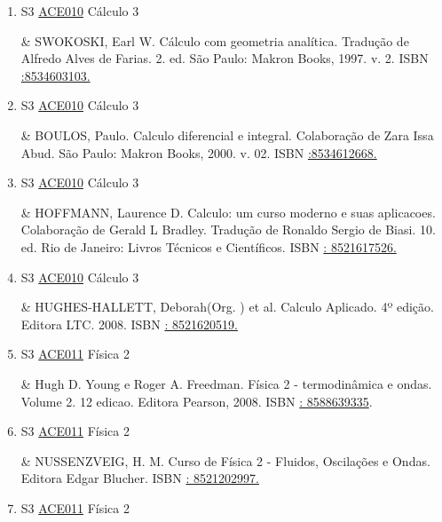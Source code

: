 \documentclass[12pt,a4paper]{book}
\begin{document}
\begin{enumerate}
 

 \item S3 \hyperref[PUD:ACE010]{ACE010} Cálculo 3

&   SWOKOSKI, Earl W.  Cálculo com geometria analítica.  Tradução de Alfredo Alves de Farias.  2.  ed.  São Paulo: Makron Books, 1997.  v. 2.  ISBN \href{http://www.google.com/search?hl=pt-BR&tbo=p&tbm=bks&q=isbn::8534603103.&num=10}{:8534603103.}
 \item S3 \hyperref[PUD:ACE010]{ACE010} Cálculo 3

&   BOULOS, Paulo.  Calculo diferencial e integral.  Colaboração de Zara Issa Abud.  São Paulo: Makron Books, 2000.  v. 02.  ISBN \href{http://www.google.com/search?hl=pt-BR&tbo=p&tbm=bks&q=isbn::8534612668.&num=10}{:8534612668.} 

 

 \item S3 \hyperref[PUD:ACE010]{ACE010} Cálculo 3

&   HOFFMANN, Laurence D.  Calculo: um curso moderno e suas aplicacoes.  Colaboração de Gerald L Bradley. Tradução de Ronaldo Sergio de Biasi.  10.  ed.  Rio de Janeiro: Livros Técnicos e Científicos.  ISBN \href{http://www.google.com/search?hl=pt-BR&tbo=p&tbm=bks&q=isbn:: 8521617526.&num=10}{: 8521617526.} 

 

 \item S3 \hyperref[PUD:ACE010]{ACE010} Cálculo 3

&   HUGHES-HALLETT, Deborah(Org. ) et al.  Calculo Aplicado.  4º edição.  Editora LTC.  2008.  ISBN \href{http://www.google.com/search?hl=pt-BR&tbo=p&tbm=bks&q=isbn:: 8521620519.&num=10}{: 8521620519.}
 \item S3 \hyperref[PUD:ACE011]{ACE011} Física 2

&  Hugh D.  Young e Roger A.  Freedman.  Física 2 - termodinâmica e ondas.  Volume 2.  12 edicao.  Editora Pearson, 2008.  ISBN \href{http://www.google.com/search?hl=pt-BR&tbo=p&tbm=bks&q=isbn:: 
8588639335&num=10}{: 
8588639335}. 

 

 \item S3 \hyperref[PUD:ACE011]{ACE011} Física 2

&   NUSSENZVEIG, H.  M.  Curso de Física 2 - Fluidos, Oscilações e Ondas.  Editora Edgar Blucher.  ISBN \href{http://www.google.com/search?hl=pt-BR&tbo=p&tbm=bks&q=isbn:: 8521202997.&num=10}{: 8521202997.} 

 

 \item S3 \hyperref[PUD:ACE011]{ACE011} Física 2


\end{enumerate}
\end{document}
